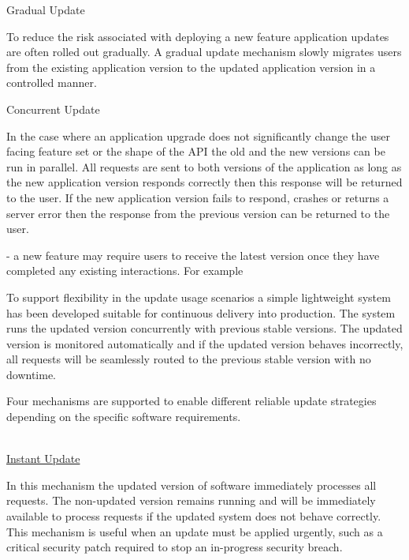 \documentclass[a4paper,11pt,twoside]{report}
\begin{document}
Gradual Update

To reduce the risk associated with deploying a new feature application updates are often rolled out gradually.  A gradual update mechanism slowly migrates users from the existing application version to the updated application version in a controlled manner.

Concurrent Update

In the case where an application upgrade does not significantly change the user facing feature set or the shape of the API the old and the new versions can be run in parallel.  All requests are sent to both versions of the application as long as the new application version responds correctly then this response will be returned to the user.  If the new application version fails to respond, crashes or returns a server error then the response from the previous version can be returned to the user.


- a new feature may require users to receive the latest version once they have completed any existing interactions.  For example 

To support flexibility in the update usage scenarios 
 a simple lightweight system has been developed suitable for continuous delivery into production. The system runs the updated version concurrently with previous stable versions. The updated version is monitored automatically and if the updated version behaves incorrectly, all requests will be seamlessly routed to the previous stable version with no downtime.

Four mechanisms are supported to enable different reliable update strategies depending on the specific software requirements.

\noindent\\
\underline{Instant Update} 

\noindent
In this mechanism the updated version of software immediately processes all requests. The non-updated version remains running and will be immediately available to process requests if the updated system does not behave correctly. This mechanism is useful when an update must be applied urgently, such as a critical security patch required to stop an in-progress security breach.
   
\end{document}
